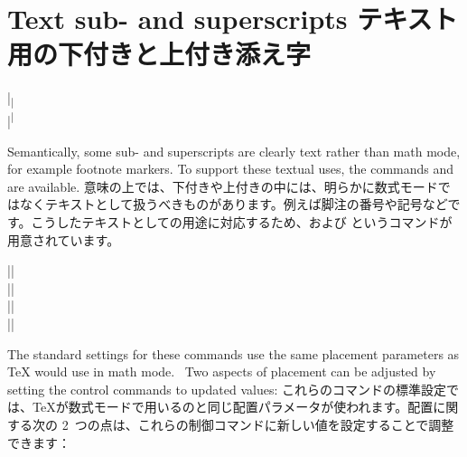 \documentclass{ltxguide}
\newcommand\jpnewline{\vspace{3pt}\newline}
\begin{document}
\section{Text sub- and superscripts
テキスト用の下付きと上付き添え字}

\begin{decl}
  |\textsubscript|  \\
  |\textsuperscript| 
\end{decl}
Semantically, some sub- and superscripts are clearly text rather than math
mode, for example footnote markers. To support these textual uses, the commands
 and  are available.
 \jpnewline
意味の上では、下付きや上付きの中には、明らかに数式モードではなくテキストとして扱うべきものがあります。例えば脚注の番号や記号などです。こうしたテキストとしての用途に対応するため、および というコマンドが用意されています。
\begin{decl}
  |\textsubscript@offset|   \\
  |\textsubscript@space|    \\
  |\textsuperscript@offset| \\
  |\textsuperscript@space|
\end{decl}
The standard settings for these commands use the same placement parameters as
\TeX{} would use in math mode.\footnotemark\
%
Two aspects of placement can be adjusted by setting the control
commands to updated values:
 \jpnewline
これらのコマンドの標準設定では、\TeX{}が数式モードで用いるのと同じ配置パラメータが使われます。\footnotemark[\value{footnote}]%
配置に関する次の 2~つの点は、これらの制御コマンドに新しい値を設定することで調整できます：
\end{document}
